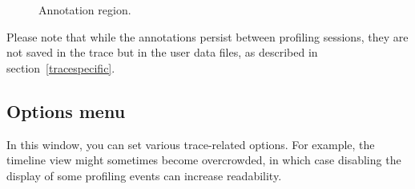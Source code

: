 \documentclass[hidelinks,titlepage,a4paper]{article}
\begin{document}
\begin{figure}[h]
\centering{}
\caption{Annotation region.}
\label{annotation}
\end{figure}

Please note that while the annotations persist between profiling sessions, they are not saved in the trace but in the user data files, as described in section~\ref{tracespecific}.

\subsection{Options menu}
\label{options}

In this window, you can set various trace-related options. For example, the timeline view might sometimes become overcrowded, in which case disabling the display of some profiling events can increase readability.
\end{document}
